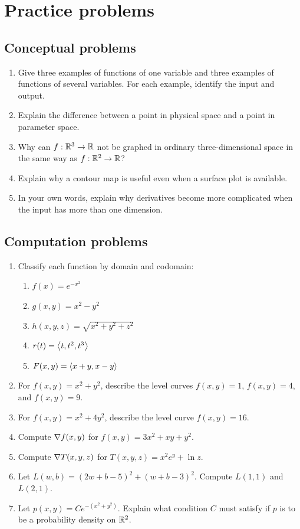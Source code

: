\section{Practice problems}

\subsection*{Conceptual problems}
\begin{enumerate}
  \item Give three examples of functions of one variable and three examples of functions of several variables. For each example, identify the input and output.
  \item Explain the difference between a point in physical space and a point in parameter space.
  \item Why can $f:\mathbb{R}^3\to\mathbb{R}$ not be graphed in ordinary three-dimensional space in the same way as $f:\mathbb{R}^2\to\mathbb{R}$?
  \item Explain why a contour map is useful even when a surface plot is available.
  \item In your own words, explain why derivatives become more complicated when the input has more than one dimension.
\end{enumerate}

\subsection*{Computation problems}
\begin{enumerate}[resume]
  \item Classify each function by domain and codomain:
  \begin{enumerate}
    \item $f(x)=e^{-x^2}$
    \item $g(x,y)=x^2-y^2$
    \item $h(x,y,z)=\sqrt{x^2+y^2+z^2}$
    \item $r(t)=\left\langle t,t^2,t^3\right\rangle$
    \item $F(x,y)=\left\langle x+y,x-y\right\rangle$
  \end{enumerate}
  \item For $f(x,y)=x^2+y^2$, describe the level curves $f(x,y)=1$, $f(x,y)=4$, and $f(x,y)=9$.
  \item For $f(x,y)=x^2+4y^2$, describe the level curve $f(x,y)=16$.
  \item Compute $\nabla f(x,y)$ for $f(x,y)=3x^2+xy+y^2$.
  \item Compute $\nabla T(x,y,z)$ for $T(x,y,z)=x^2e^y+\ln z$.
  \item Let $L(w,b)=(2w+b-5)^2+(w+b-3)^2$. Compute $L(1,1)$ and $L(2,1)$.
  \item Let $p(x,y)=Ce^{-(x^2+y^2)}$. Explain what condition $C$ must satisfy if $p$ is to be a probability density on $\mathbb{R}^2$.
\end{enumerate}

